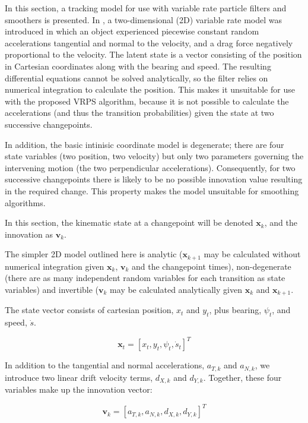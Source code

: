 \documentclass[journal]{IEEEtran}
\begin{document}
In this section, a tracking model for use with variable rate particle filters and smoothers is presented. In \cite{Godsill2007,Godsill2007a}, a two-dimensional (2D) variable rate model was introduced in which an object experienced piecewise constant random accelerations tangential and normal to the velocity, and a drag force negatively proportional to the velocity. The latent state is a vector consisting of the position in Cartesian coordinates along with the bearing and speed. The resulting differential equations cannot be solved analytically, so the filter relies on numerical integration to calculate the position. This makes it unsuitable for use with the proposed VRPS algorithm, because it is not possible to calculate the accelerations (and thus the transition probabilities) given the state at two successive changepoints.

In addition, the basic intinisic coordinate model is degenerate; there are four state variables (two position, two velocity) but only two parameters governing the intervening motion (the two perpendicular accelerations). Consequently, for two successive changepoints there is likely to be no possible innovation value resulting in the required change. This property makes the model unsuitable for smoothing algorithms.

In this section, the kinematic state at a changepoint will be denoted $\mathbf{x}_{k}$, and the innovation as $\mathbf{v}_{k}$.

The simpler 2D model outlined here is analytic ($\mathbf{x}_{k+1}$ may be calculated without numerical integration given $\mathbf{x}_k$, $\mathbf{v}_k$ and the changepoint times), non-degenerate (there are as many independent random variables for each transition as state variables) and invertible ($\mathbf{v}_k$ may be calculated analytically given $\mathbf{x}_k$ and $\mathbf{x}_{k+1}$.

The state vector consists of cartesian position, $x_t$ and $y_t$, plus bearing, $\psi_t$, and speed, $\dot{s}$.

\begin{equation}
\mathbf{x}_t = [x_t, y_t, \psi_t, \dot{s}_t]^T
\end{equation}

In addition to the tangential and normal accelerations, $a_{T,k}$ and $a_{N,k}$, we introduce two linear drift velocity terms, $d_{X,k}$ and $d_{Y,k}$. Together, these four variables make up the innovation vector:

\begin{equation}
\mathbf{v}_k = [a_{T,k}, a_{N,k}, d_{X,k}, d_{Y,k}]^T
\end{equation}
\end{document}
